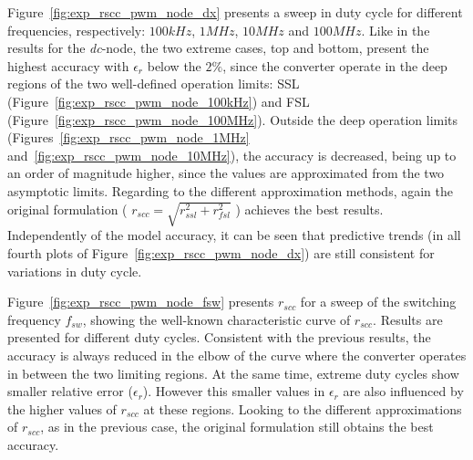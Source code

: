 Figure~\ref{fig:exp_rscc_pwm_node_dx} presents a sweep in duty cycle for different frequencies, respectively: $100kHz$, $1MHz$, $10MHz$ and $100MHz$. Like in the results for the \emph{dc}-node, the two extreme cases, top and bottom, present the highest accuracy with $\epsilon_r$ below the $2\%$, since the converter operate in the deep regions of the two well-defined operation limits: SSL (Figure~\ref{fig:exp_rscc_pwm_node_100kHz}) and FSL (Figure~\ref{fig:exp_rscc_pwm_node_100MHz}). Outside the deep operation limits (Figures~\ref{fig:exp_rscc_pwm_node_1MHz} and~\ref{fig:exp_rscc_pwm_node_10MHz}), the accuracy is decreased, being  up to an order of magnitude higher, since the values are approximated from the two asymptotic limits. Regarding to the different approximation methods, again the original formulation ( $r_{scc} = \sqrt{r_{ssl}^2 + r_{fsl}^2}$ ) achieves the best results.  Independently of the model accuracy, it can be seen that predictive trends (in all fourth plots of Figure~\ref{fig:exp_rscc_pwm_node_dx}) are still consistent for variations in duty cycle.

Figure~\ref{fig:exp_rscc_pwm_node_fsw} presents $r_{scc}$ for a sweep of the switching frequency $f_{sw}$, showing the well-known characteristic curve of $r_{scc}$. Results are presented  for different duty cycles. Consistent with the previous results, the accuracy is always reduced in the elbow of the curve where the converter operates in between the two limiting regions. At the same time, extreme duty cycles show smaller relative error ($\epsilon_r$). However this smaller values in $\epsilon_r$ are also influenced by the higher values of $r_{scc}$ at these regions.  Looking to the different approximations of $r_{scc}$, as in the previous case, the original formulation still obtains the best accuracy.

